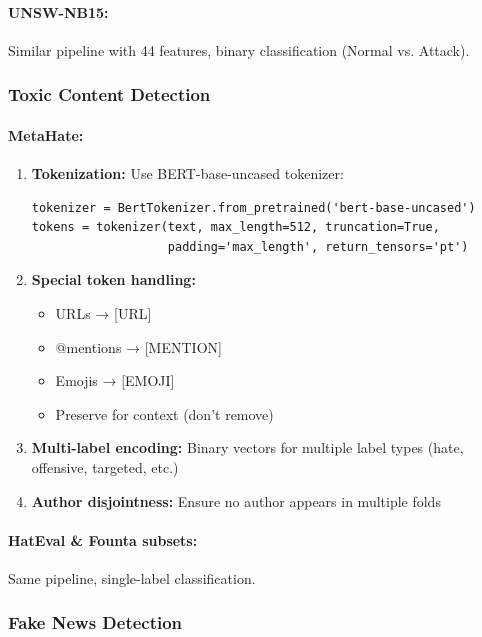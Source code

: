 \documentclass[12pt,a4paper]{article}
\theoremstyle{definition}
\begin{document}
\paragraph{UNSW-NB15:}
Similar pipeline with 44 features, binary classification (Normal vs. Attack).

\subsubsection{Toxic Content Detection}

\paragraph{MetaHate:}
\begin{enumerate}
\item \textbf{Tokenization:} Use BERT-base-uncased tokenizer:
\begin{verbatim}
tokenizer = BertTokenizer.from_pretrained('bert-base-uncased')
tokens = tokenizer(text, max_length=512, truncation=True, 
                   padding='max_length', return_tensors='pt')
\end{verbatim}

\item \textbf{Special token handling:}
\begin{itemize}
\item URLs → [URL]
\item @mentions → [MENTION]
\item Emojis → [EMOJI]
\item Preserve for context (don't remove)
\end{itemize}

\item \textbf{Multi-label encoding:} Binary vectors for multiple label types (hate, offensive, targeted, etc.)

\item \textbf{Author disjointness:} Ensure no author appears in multiple folds
\end{enumerate}

\paragraph{HatEval \& Founta subsets:}
Same pipeline, single-label classification.

\subsubsection{Fake News Detection}
\end{document}
